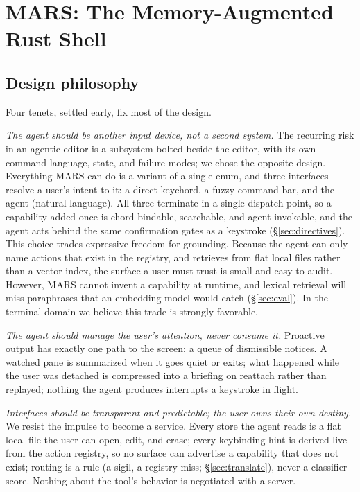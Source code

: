 \section{MARS: The Memory-Augmented Rust Shell}
\label{sec:agent}



\subsection{Design philosophy}
\label{sec:design}

Four tenets, settled early, fix most of the design.

\emph{The agent should be another input device, not a second system.} The recurring
risk in an agentic editor is a subsystem bolted beside the editor, with its own
command language, state, and failure modes; we chose the opposite design. Everything
MARS can do is a variant of a single  enum, and three
interfaces resolve a user's intent to it: a direct keychord, a fuzzy
command bar, and the agent (natural language). All three terminate in a
single dispatch point, so a capability added once is chord-bindable, searchable, and
agent-invokable, and the agent acts behind the same confirmation gates as a keystroke
(\S\ref{sec:directives}). This choice trades expressive freedom for grounding. Because the agent can only name
actions that exist in the registry, and retrieves from flat local files rather than a
vector index, the surface a user must trust is small and easy to audit. However, MARS
cannot invent a capability at runtime, and lexical retrieval will miss paraphrases that
an embedding model would catch (\S\ref{sec:eval}). In the terminal domain we believe this trade is
strongly favorable.

\emph{The agent should manage the user's attention, never consume it.} Proactive
output has exactly one path to the screen: a queue of dismissible notices. A watched
pane is summarized when it goes quiet or exits; what happened while the user was
detached is compressed into a briefing on reattach rather than replayed; nothing the
agent produces interrupts a keystroke in flight.

\emph{Interfaces should be transparent and predictable; the user owns their own
destiny.} We resist the impulse to become a service. Every store the agent reads is a
flat local file the user can open, edit, and erase; every keybinding hint is derived
live from the action registry, so no surface can advertise a capability that does not
exist; routing is a rule (a sigil, a registry miss; \S\ref{sec:translate}), never a
classifier score. Nothing about the tool's behavior is negotiated with a server.

